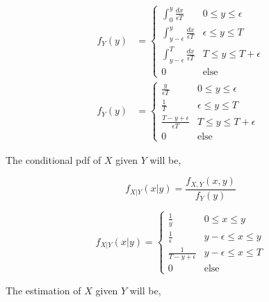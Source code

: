 \documentclass{article}
\theoremstyle{mytheoremstyle}
\theoremstyle{mytheoremstyle}
\theoremstyle{myproblemstyle}
\begin{document}
\begin{equation}
	\begin{split}
		f_Y(y)&=\begin{cases}
			\displaystyle\int_{0}^{y}\frac{dx}{\epsilon T}          & 0\le y\le \epsilon   \\
			\displaystyle\int_{y-\epsilon}^{y}\frac{dx}{\epsilon T} & \epsilon\le y\le T   \\
			\displaystyle\int_{y-\epsilon}^{T}\frac{dx}{\epsilon T} & T\le y\le T+\epsilon \\
			0                                                       & \text{else}
		\end{cases}\\
		f_Y(y)&=\begin{cases}
			\displaystyle\frac{y}{\epsilon T}            & 0\le y\le \epsilon   \\
			\displaystyle\frac{1}{T}                     & \epsilon\le y\le T   \\
			\displaystyle\frac{T-y+\epsilon}{\epsilon T} & T\le y\le T+\epsilon \\
			0                                            & \text{else}
		\end{cases}
	\end{split}
\end{equation}

The conditional pdf of \(X\) given \(Y\) will be,

\[f_{X|Y}(x|y)=\frac{f_{X,Y}(x,y)}{f_{Y}(y)}\]

\begin{equation*}
	f_{X|Y}(x|y)=\begin{cases}
		\displaystyle\frac{1}{y}            & 0\le x\le y          \\
		\displaystyle\frac{1}{\epsilon}     & y-\epsilon\le x\le y \\
		\displaystyle\frac{1}{T-y+\epsilon} & y-\epsilon\le x\le T \\
		0                                   & \text{else}
	\end{cases}
\end{equation*}

The estimation of \(X\) given \(Y\) will be,
\end{document}
